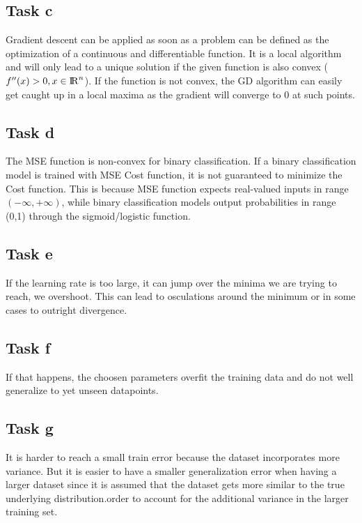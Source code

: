 \documentclass[onecolumn]{article}
\begin{document}
\subsection{Task c}
Gradient descent can be applied as soon as a problem can be defined as the optimization of a continuous and differentiable function. It is a local algorithm and will only lead to a unique solution if the given function is also convex ($f^{\prime\prime}(x)>0, x \in {\rm I\!R}^n$). If the function is not convex, the GD algorithm can easily get caught up in a local maxima as the gradient will converge to $0$ at such points.

\subsection{Task d}
The MSE function is non-convex for binary classification. If a binary classification model is trained with MSE Cost function, it is not guaranteed to minimize the Cost function. This is because MSE function expects real-valued inputs in range $(-\infty, +\infty)$, while binary classification models output probabilities in range (0,1) through the sigmoid/logistic function.

\subsection{Task e}
If the learning rate is too large, it can jump over the minima we are trying to reach, we
overshoot. This can lead to osculations around the minimum or in some cases to outright
divergence.

\subsection{Task f}
If that happens, the choosen parameters overfit the training data and do not well generalize to yet unseen datapoints.

\subsection{Task g}
It is harder to reach a small train error because the dataset incorporates more variance. But it is easier to have a smaller generalization error when having a larger dataset since it is assumed that the dataset gets more similar to the true underlying distribution.order to account for the additional variance in the larger training set.
\end{document}
